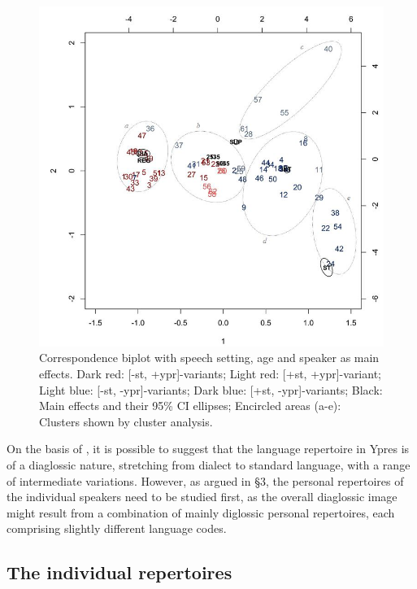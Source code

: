\documentclass[output=paper]{LSP/langsci}
\begin{document}
\begin{figure}
\includegraphics[width=\textwidth]{illustrations/ghys_fig2.png}
\caption{Correspondence biplot with speech setting, age and speaker as main effects. Dark red: [-st, +ypr]-variants; 
Light red: [+st, +ypr]-variant;
Light blue: [-st, -ypr]-variants;
Dark blue: [+st, -ypr]-variants;
Black: Main effects and their 95\% CI ellipses;
Encircled areas (a-e): Clusters shown by cluster analysis.}
\label{fig:2}
\end{figure}

On the basis of , it is possible to suggest that the language repertoire in Ypres is of a diaglossic nature, stretching from dialect to standard language, with a range of intermediate variations. However, as argued in §3, the personal repertoires of the individual speakers need to be studied first, as the overall diaglossic image might result from a combination of mainly diglossic personal repertoires, each comprising slightly different language codes.

\subsection{The individual repertoires}
\end{document}
